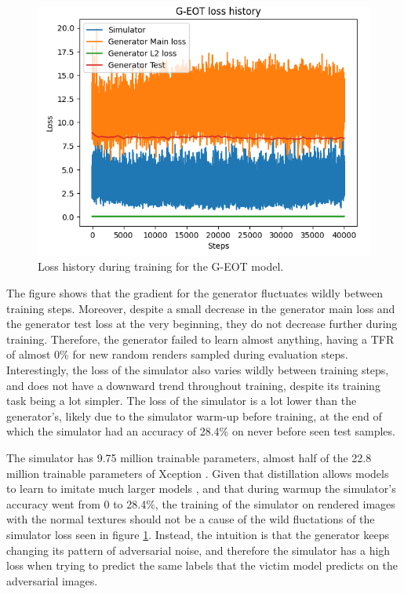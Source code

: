 \begin{figure}[H]
    \centering
    \includegraphics[width=1\textwidth]{graphics/g_eot_loss_exp1.PNG}
    \caption{Loss history during training for the G-EOT model.}
    \label{fig:g_eot_loss_history}
\end{figure}

The figure shows that the gradient for the generator fluctuates wildly between training steps. Moreover, despite a small decrease in the generator main loss and the generator test loss at the very beginning, they do not decrease further during training. Therefore, the generator failed to learn almost anything, having a TFR of almost 0\% for new random renders sampled during evaluation steps. Interestingly, the loss of the simulator also varies wildly between training steps, and does not have a downward trend throughout training, despite its training task being a lot simpler. The loss of the simulator is a lot lower than the generator's, likely due to the simulator warm-up before training, at the end of which the simulator had an accuracy of 28.4\% on never before seen test samples.

The simulator has 9.75 million trainable parameters, almost half of the 22.8 million trainable parameters of Xception \cite{xception}. Given that distillation allows models to learn to imitate much larger models \cite{distillation}, and that during warmup the simulator's accuracy went from 0 to 28.4\%, the training of the simulator on rendered images with the normal textures should not be a cause of the wild fluctations of the simulator loss seen in figure \ref{fig:g_eot_loss_history}. Instead, the intuition is that the generator keeps changing its pattern of adversarial noise, and therefore the simulator has a high loss when trying to predict the same labels that the victim model predicts on the adversarial images.

